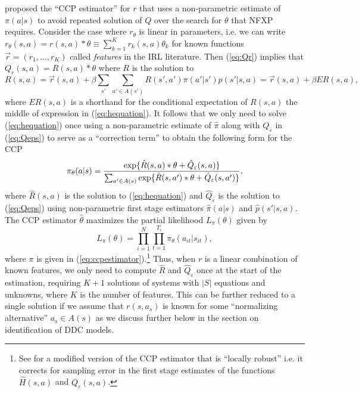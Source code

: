 \citet{hotzmiller:1993} proposed the ``CCP estimator'' 
for $r$ that uses a non-parametric estimate of $\pi(a|s)$ to avoid repeated 
solution of $Q$ over the search for $\theta$ that NFXP requires. Consider the case where $r_\theta$ is linear in parameters,
i.e. we can write $r_\theta(s,a)=r(s,a)*\theta \equiv \sum_{k=1}^K r_k(s,a)\theta_k$ for known functions
 $\vec{r}=(r_1,\ldots,r_K)$ called {\it features\/} in the IRL
literature. Then (\ref{eq:Qr}) implies that $Q_r(s,a)=R(s,a)*\theta$ where
$R$ is the solution to
\begin{equation}
   R(s,a)=\vec{r}(s,a) + \beta \sum_{s'} \sum_{a' \in A(s')} R(s',a')\pi(a'|s')p(s'|s,a) = \vec{r}(s,a)+\beta ER(s,a),
\label{eq:hequation}
\end{equation}
where $ER(s,a)$ is a shorthand for the conditional expectation of $R(s,a)$ the middle of expression in (\ref{eq:hequation}).
It follows that we only need to solve (\ref{eq:hequation}) once using a non-parametric estimate of $\hat\pi$ along with
$Q_\varepsilon$ in (\ref{eq:Qeps}) to serve as a ``correction term''  to obtain the following form for the CCP
\begin{equation}  
           \pi_\theta(a|s) = {\exp\{\hat R(s,a)*\theta+\hat Q_\varepsilon(s,a)\} \over \sum_{a' \in A(s)} 
\exp\{\hat R(s,a')*\theta+\hat Q_\varepsilon(s,a')\}},
\label{eq:ccpestimator}
\end{equation}
where $\hat R(s,a)$ is the solution to (\ref{eq:hequation}) and $\hat Q_\varepsilon$ is the solution
to (\ref{eq:Qeps}) using non-parametric first stage
estimators $\hat\pi(a|s)$ and $\hat p(s'|s,a)$. The CCP estimator $\hat\theta$ maximizes the partial likelihood $L_\pi(\theta)$ given by 
\begin{equation}
    L_\pi(\theta) = \prod_{i=1}^N \prod_{t=1}^{T_i}  \pi_\theta(a_{it}|s_{it}),
\label{eq:ccplf}
\end{equation}
where $\pi$ is given in (\ref{eq:ccpestimator}).\footnote{\footnotesize See \citet{lrspe:2022} 
for  a modified version of the CCP estimator that is ``locally robust'' i.e. it corrects for sampling
error in the first stage estimates of the functions $\hat H(s,a)$ and $Q_\varepsilon(s,a)$.}
Thus, when $r$ is a  linear combination of known features, we only  need to compute $\hat R$ and $\hat Q_\varepsilon$ once
at the start of the estimation, requiring  $K+1$ solutions of systems with $|S|$ equations and unknowns,
where $K$ is the number of features. This can be further reduced to
a single solution if we assume that $r(s,a_s)$ is known for some
``normalizing alternative'' $a_s \in A(s)$ as we discuss further below in the
section on identification of DDC models.

